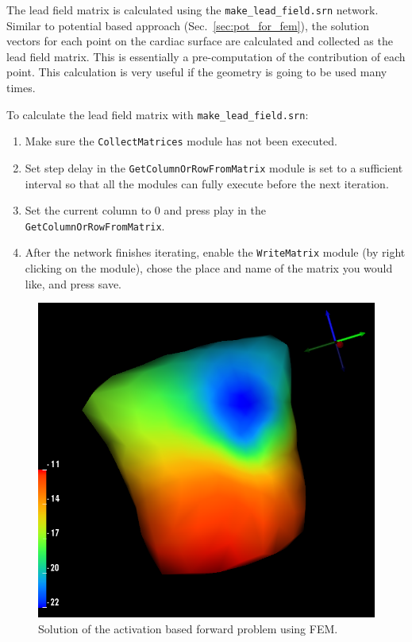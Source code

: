 The lead field matrix is calculated using the  {\tt make\_lead\_field.srn} network.  Similar to potential based approach (Sec.~\ref{sec:pot_for_fem}), the solution vectors for each point on the cardiac surface are calculated and collected as the lead field matrix.  This is essentially a pre-computation of the contribution of each point.  This calculation is very useful if the geometry is going to be used many times.
  
  
  To calculate the lead field matrix with {\tt make\_lead\_field.srn}:
\begin{enumerate}
\item{Make sure the {\tt CollectMatrices} module has not been executed.}
\item{Set step delay in the {\tt GetColumnOrRowFromMatrix} module is set to a sufficient interval so that all the modules can fully execute before the next iteration.}
\item{Set the current column to 0 and press play in the {\tt GetColumnOrRowFromMatrix}.}
\item{After the network finishes iterating, enable the {\tt WriteMatrix} module (by right clicking on the module), chose the place and name of the matrix you would like, and press save.  }
\end{enumerate}

\begin{figure}[H]
\begin{center}
\includegraphics[width=\textwidth]{ECGToolkitGuide_figures/act_for_fem_results.png}
\caption{Solution of the activation based forward problem using FEM.}
\label{fig:act_fem_for_sol}
\end{center}
\end{figure}

